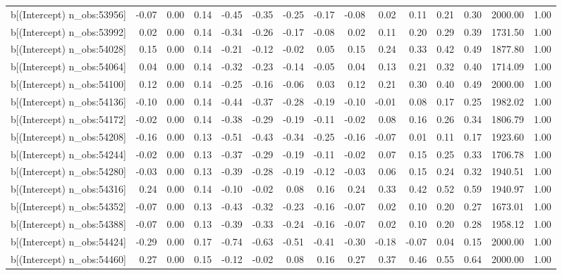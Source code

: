 \begin{table}[ht]
\begin{tabular}{rrrrrrrrrrrrrrr}
  b[(Intercept) n\_obs:53956] & -0.07 & 0.00 & 0.14 & -0.45 & -0.35 & -0.25 & -0.17 & -0.08 & 0.02 & 0.11 & 0.21 & 0.30 & 2000.00 & 1.00 \\ 
  b[(Intercept) n\_obs:53992] & 0.02 & 0.00 & 0.14 & -0.34 & -0.26 & -0.17 & -0.08 & 0.02 & 0.11 & 0.20 & 0.29 & 0.39 & 1731.50 & 1.00 \\ 
  b[(Intercept) n\_obs:54028] & 0.15 & 0.00 & 0.14 & -0.21 & -0.12 & -0.02 & 0.05 & 0.15 & 0.24 & 0.33 & 0.42 & 0.49 & 1877.80 & 1.00 \\ 
  b[(Intercept) n\_obs:54064] & 0.04 & 0.00 & 0.14 & -0.32 & -0.23 & -0.14 & -0.05 & 0.04 & 0.13 & 0.21 & 0.32 & 0.40 & 1714.09 & 1.00 \\ 
  b[(Intercept) n\_obs:54100] & 0.12 & 0.00 & 0.14 & -0.25 & -0.16 & -0.06 & 0.03 & 0.12 & 0.21 & 0.30 & 0.40 & 0.49 & 2000.00 & 1.00 \\ 
  b[(Intercept) n\_obs:54136] & -0.10 & 0.00 & 0.14 & -0.44 & -0.37 & -0.28 & -0.19 & -0.10 & -0.01 & 0.08 & 0.17 & 0.25 & 1982.02 & 1.00 \\ 
  b[(Intercept) n\_obs:54172] & -0.02 & 0.00 & 0.14 & -0.38 & -0.29 & -0.19 & -0.11 & -0.02 & 0.08 & 0.16 & 0.26 & 0.34 & 1806.79 & 1.00 \\ 
  b[(Intercept) n\_obs:54208] & -0.16 & 0.00 & 0.13 & -0.51 & -0.43 & -0.34 & -0.25 & -0.16 & -0.07 & 0.01 & 0.11 & 0.17 & 1923.60 & 1.00 \\ 
  b[(Intercept) n\_obs:54244] & -0.02 & 0.00 & 0.13 & -0.37 & -0.29 & -0.19 & -0.11 & -0.02 & 0.07 & 0.15 & 0.25 & 0.33 & 1706.78 & 1.00 \\ 
  b[(Intercept) n\_obs:54280] & -0.03 & 0.00 & 0.13 & -0.39 & -0.28 & -0.19 & -0.12 & -0.03 & 0.06 & 0.15 & 0.24 & 0.32 & 1940.51 & 1.00 \\ 
  b[(Intercept) n\_obs:54316] & 0.24 & 0.00 & 0.14 & -0.10 & -0.02 & 0.08 & 0.16 & 0.24 & 0.33 & 0.42 & 0.52 & 0.59 & 1940.97 & 1.00 \\ 
  b[(Intercept) n\_obs:54352] & -0.07 & 0.00 & 0.13 & -0.43 & -0.32 & -0.23 & -0.16 & -0.07 & 0.02 & 0.10 & 0.20 & 0.27 & 1673.01 & 1.00 \\ 
  b[(Intercept) n\_obs:54388] & -0.07 & 0.00 & 0.13 & -0.39 & -0.33 & -0.24 & -0.16 & -0.07 & 0.02 & 0.10 & 0.20 & 0.28 & 1958.12 & 1.00 \\ 
  b[(Intercept) n\_obs:54424] & -0.29 & 0.00 & 0.17 & -0.74 & -0.63 & -0.51 & -0.41 & -0.30 & -0.18 & -0.07 & 0.04 & 0.15 & 2000.00 & 1.00 \\ 
  b[(Intercept) n\_obs:54460] & 0.27 & 0.00 & 0.15 & -0.12 & -0.02 & 0.08 & 0.16 & 0.27 & 0.37 & 0.46 & 0.55 & 0.64 & 2000.00 & 1.00 \\ 

\end{tabular}
\end{table}
